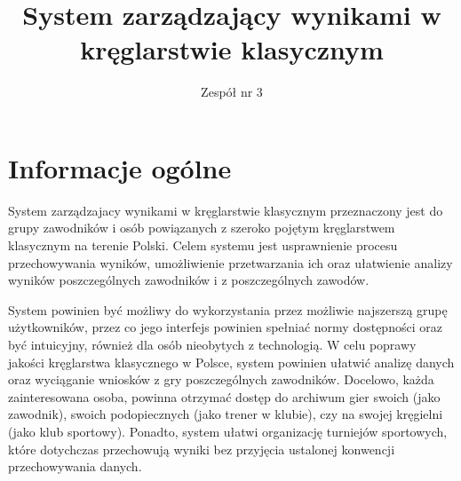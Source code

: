 \documentclass[polish, a4paper]{article}
\title{\vspace{3ex} System zarządzający wynikami w kręglarstwie klasycznym}
\author{Zespół nr 3}
\date{\vspace{-8ex}} %
\begin{document}
\renewcommand{\labelenumii}{\arabic{enumi}.\arabic{enumii}}
\renewcommand{\labelenumiii}{\arabic{enumi}.\arabic{enumii}.\arabic{enumiii}}
\renewcommand{\labelenumiv}{\arabic{enumi}.\arabic{enumii}.\arabic{enumiii}.\arabic{enumiv}}

\maketitle

\begin{table}[H]
\end{table}

\tableofcontents

\newpage



\section{Informacje ogólne}

System zarządzajacy wynikami w kręglarstwie klasycznym przeznaczony jest do grupy zawodników i osób powiązanych z szeroko pojętym kręglarstwem klasycznym na terenie Polski. Celem systemu jest usprawnienie procesu przechowywania wyników, umożliwienie przetwarzania ich oraz ułatwienie analizy wyników poszczególnych zawodników i z poszczególnych zawodów. 

System powinien być możliwy do wykorzystania przez możliwie najszerszą grupę użytkowników, przez co jego interfejs powinien spełniać normy dostępności oraz być intuicyjny, również dla osób nieobytych z technologią. W celu poprawy jakości kręglarstwa klasycznego w Polsce, system powinien ułatwić analizę danych oraz wyciąganie wniosków z gry poszczególnych zawodników. Docelowo, każda zainteresowana osoba, powinna otrzymać dostęp do archiwum gier swoich (jako zawodnik), swoich podopiecznych (jako trener w klubie), czy na swojej kręgielni (jako klub sportowy). Ponadto, system ułatwi organizację turniejów sportowych, które dotychczas przechowują wyniki bez przyjęcia ustalonej konwencji przechowywania danych.
\end{document}
